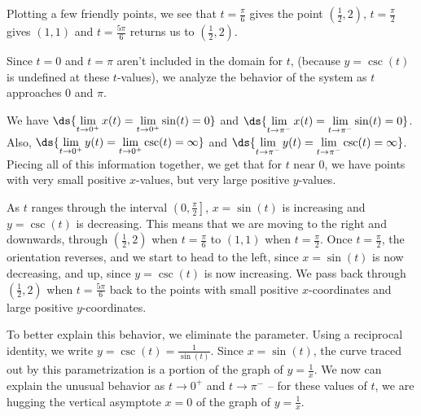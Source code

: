 \documentclass{ximera}
\begin{document}
\begin{example}
\begin{explanation}
\begin{enumerate}
 

Plotting a few friendly points, we see that $t = \frac{\pi}{6}$ gives the point $\left(\frac{1}{2}, 2\right)$, $t = \frac{\pi}{2}$ gives $(1,1)$ and $t = \frac{5\pi}{6}$ returns us to $\left( \frac{1}{2}, 2\right)$.  

 

Since $t=0$ and $t=\pi$ aren't included in the domain for $t$, (because $y = \csc(t)$ is undefined at these $t$-values),  we analyze the behavior of the system as $t$ approaches  $0$ and $\pi$.  

 

We have $\ds{\lim_{t \rightarrow 0^{+}} x(t) =  \lim_{t \rightarrow 0^{+}} \sin(t) = 0}$ and $\ds{\lim_{t \rightarrow \pi^{-}} x(t) =  \lim_{t \rightarrow \pi^{-}} \sin(t) = 0}$. Also, $\ds{\lim_{t \rightarrow 0^{+}} y(t) =  \lim_{t \rightarrow 0^{+}} \csc(t) = \infty}$ and $\ds{\lim_{t \rightarrow \pi^{-}} y(t) =  \lim_{t \rightarrow \pi^{-}} \csc(t) = \infty}$.  Piecing all of this information together, we get that for $t$ near $0$, we have points with very small positive $x$-values, but very large positive $y$-values.  

 

As $t$ ranges through the interval $\left(0, \frac{\pi}{2}\right]$, $x = \sin(t)$ is increasing and $y = \csc(t)$ is decreasing.  This means that we are moving to the right and downwards, through $\left( \frac{1}{2}, 2\right)$ when $t = \frac{\pi}{6}$ to $(1,1)$ when $t = \frac{\pi}{2}$. Once $t = \frac{\pi}{2}$, the orientation reverses, and we start to head to the left, since $x = \sin(t)$ is now decreasing, and up, since $y = \csc(t)$ is now increasing.  We pass back through $\left( \frac{1}{2}, 2\right)$ when $t = \frac{5\pi}{6}$ back to the points with small positive $x$-coordinates and large positive $y$-coordinates. 

\begin{center}
\end{center}

  

 To better explain this behavior, we eliminate the parameter. Using a reciprocal identity, we  write $y = \csc(t) = \frac{1}{\sin(t)}$.  Since $x =\sin(t)$, the curve traced out by this parametrization is a portion of the graph of $y = \frac{1}{x}$.   We now can explain the unusual behavior as $t \rightarrow 0^{+}$ and $t \rightarrow \pi^{-}$ -- for these values of $t$, we are hugging the vertical asymptote $x=0$ of the graph of $y = \frac{1}{x}$.  
 

\end{enumerate}
\end{explanation}
\end{example}
\end{document}
